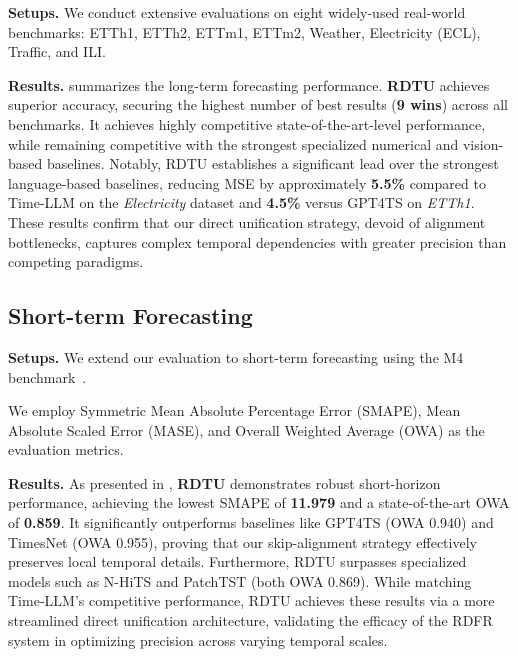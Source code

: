 \noindent\textbf{Setups.} We conduct extensive evaluations on eight widely-used real-world benchmarks: ETTh1, ETTh2, ETTm1, ETTm2, Weather, Electricity (ECL), Traffic, and ILI.

\noindent\textbf{Results.}  summarizes the long-term forecasting performance. \textbf{RDTU} achieves superior accuracy, securing the highest number of best results (\textbf{9 wins}) across all benchmarks. It achieves highly competitive state-of-the-art-level performance, while remaining competitive with the strongest specialized numerical and vision-based baselines. Notably, RDTU establishes a significant lead over the strongest language-based baselines, reducing MSE by approximately \textbf{5.5\%} compared to Time-LLM on the \textit{Electricity} dataset and \textbf{4.5\%} versus GPT4TS on \textit{ETTh1}. These results confirm that our direct unification strategy, devoid of alignment bottlenecks, captures complex temporal dependencies with greater precision than competing paradigms.

\subsection{Short-term Forecasting}

\noindent\textbf{Setups.} We extend our evaluation to short-term forecasting using the M4 benchmark~\citep{makridakis2018m4}.

We employ Symmetric Mean Absolute Percentage Error (SMAPE), Mean Absolute Scaled Error (MASE), and Overall Weighted Average (OWA) as the evaluation metrics.

\noindent\textbf{Results.} As presented in , \textbf{RDTU} demonstrates robust short-horizon performance, achieving the lowest SMAPE of \textbf{11.979} and a state-of-the-art OWA of \textbf{0.859}. It significantly outperforms baselines like GPT4TS (OWA 0.940) and TimesNet (OWA 0.955), proving that our skip-alignment strategy effectively preserves local temporal details. Furthermore, RDTU surpasses specialized models such as N-HiTS and PatchTST (both OWA 0.869). While matching Time-LLM's competitive performance, RDTU achieves these results via a more streamlined direct unification architecture, validating the efficacy of the RDFR system in optimizing precision across varying temporal scales.




